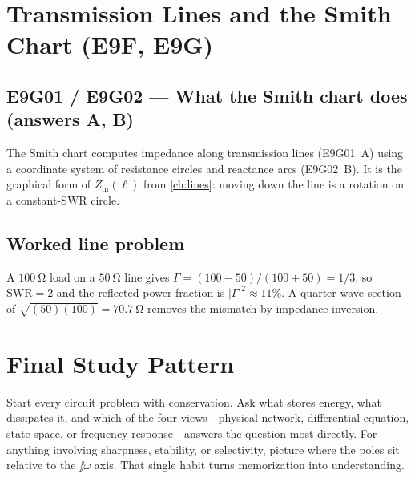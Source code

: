 \section{Transmission Lines and the Smith Chart (E9F, E9G)}

\subsection*{E9G01 / E9G02 --- What the Smith chart does (answers A, B)}
The Smith chart computes impedance along transmission lines (E9G01~A) using a
coordinate system of resistance circles and reactance arcs (E9G02~B). It is the
graphical form of \(Z_{\mathrm{in}}(\ell)\) from \cref{ch:lines}: moving down the
line is a rotation on a constant-SWR circle.

\subsection*{Worked line problem}
A \(\SI{100}{\ohm}\) load on a \(\SI{50}{\ohm}\) line gives
\(\Gamma=(100-50)/(100+50)=1/3\), so \(\mathrm{SWR}=2\) and the reflected power
fraction is \(|\Gamma|^2\approx11\%\). A quarter-wave section of
\(\sqrt{(50)(100)}=\SI{70.7}{\ohm}\) removes the mismatch by impedance inversion.

\section{Final Study Pattern}
Start every circuit problem with conservation. Ask what stores energy, what
dissipates it, and which of the four views---physical network, differential
equation, state-space, or frequency response---answers the question most directly. For anything
involving sharpness, stability, or selectivity, picture where the poles sit
relative to the \(\jj\omega\) axis. That single habit turns memorization into
understanding.
